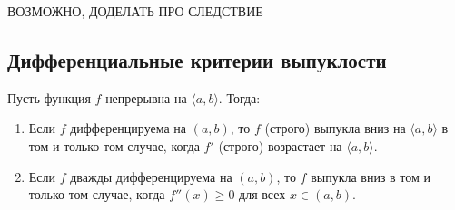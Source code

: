 ВОЗМОЖНО, ДОДЕЛАТЬ ПРО СЛЕДСТВИЕ

\subsection{Дифференциальные критерии выпуклости}

\begin{theorem}
	Пусть функция \(f\) непрерывна на \(\langle a, b \rangle\). Тогда:
	\begin{enumerate}
		\item Если \(f\) дифференцируема на \((a, b)\), то \(f\) (строго) выпукла вниз на \(\langle a, b \rangle\) в том и только том случае, когда \(f'\) (строго) возрастает на \(\langle a, b \rangle\).
		\item Если \(f\) дважды дифференцируема на \((a, b)\), то \(f\) выпукла вниз в том и только том случае, когда \(f''(x) \geqslant 0\) для всех \(x \in (a, b)\).
	\end{enumerate}
\end{theorem}


